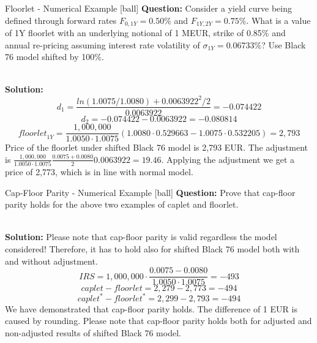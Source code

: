 \documentclass{beamer}
\begin{document}
\begin{frame}{Floorlet - Numerical Example}
[ball]
\textbf{Question:}
Consider a yield curve being defined through forward rates $F_{0, 1Y} = 0.50\%$ and $F_{1Y, 2Y} = 0.75\%$. What is a value of 1Y floorlet with an underlying notional of 1 MEUR, strike of 0.85\% and annual re-pricing assuming interest rate volatility of $\sigma_{1Y} = 0.06733\%$? Use Black 76 model shifted by 100\%.

\mbox{}\\
\textbf{Solution:}
\begin{equation}
d_1 = \frac{ln(1.0075 / 1.0080) + 0.0063922^2 / 2}{0.0063922} = -0.074422
\end{equation}
\begin{equation}
d_2 = -0.074422 - 0.0063922 = -0.080814
\end{equation}
\begin{equation}
\textit{floorlet}_{1Y} = \frac{1,000,000}{1.0050 \cdot 1.0075}\left(1.0080 \cdot 0.529663 - 1.0075 \cdot 0.532205 \right) = 2,793
\end{equation}
Price of the floorlet under shifted Black 76 model is 2,793 EUR. The adjustment is $\frac{1,000,000}{1.0050 \cdot 1.0075}\frac{0.0075 + 0.0080}{2}0.0063922 = 19.46$. Applying the adjustment we get a price of 2,773, which is in line with normal model.
\end{frame}

\begin{frame}{Cap-Floor Parity - Numerical Example}
[ball]
\textbf{Question:}
Prove that cap-floor parity holds for the above two examples of caplet and floorlet.

\mbox{}\\
\textbf{Solution:}
Please note that cap-floor parity is valid regardless the model considered! Therefore, it has to hold also for shifted Black 76 model both with and without adjustment.
\begin{equation}
IRS = 1,000,000 \cdot \frac{0.0075 - 0.0080}{1.0050 \cdot 1.0075} = -493
\end{equation}
\begin{equation}
caplet - floorlet = 2,279 - 2,773 = -494
\end{equation}
\begin{equation}
caplet^* - floorlet^* = 2,299 - 2,793 = -494
\end{equation}
We have demonstrated that cap-floor parity holds. The difference of 1 EUR is caused by rounding. Please note that cap-floor parity holds both for adjusted and non-adjusted results of shifted Black 76 model.
\end{frame}
\end{document}
